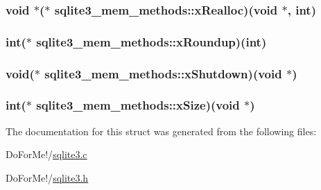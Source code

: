 \hypertarget{structsqlite3__mem__methods_a5bb7e62164d0934888473c618c61dc77}{
\subsubsection[{x\-Realloc}]{\setlength{\rightskip}{0pt plus 5cm}void $\ast$($\ast$ sqlite3\-\_\-mem\-\_\-methods\-::x\-Realloc)(void $\ast$, int)}}\label{structsqlite3__mem__methods_a5bb7e62164d0934888473c618c61dc77}
\hypertarget{structsqlite3__mem__methods_a8b3f0d1ddeb498c4aaf9bbce5b92a268}{
\subsubsection[{x\-Roundup}]{\setlength{\rightskip}{0pt plus 5cm}int($\ast$ sqlite3\-\_\-mem\-\_\-methods\-::x\-Roundup)(int)}}\label{structsqlite3__mem__methods_a8b3f0d1ddeb498c4aaf9bbce5b92a268}
\hypertarget{structsqlite3__mem__methods_a6f48100692bd935d7f3dbb8c701ab6ca}{
\subsubsection[{x\-Shutdown}]{\setlength{\rightskip}{0pt plus 5cm}void($\ast$ sqlite3\-\_\-mem\-\_\-methods\-::x\-Shutdown)(void $\ast$)}}\label{structsqlite3__mem__methods_a6f48100692bd935d7f3dbb8c701ab6ca}
\hypertarget{structsqlite3__mem__methods_a6c68275b577d66ae659ef30344c8f86c}{
\subsubsection[{x\-Size}]{\setlength{\rightskip}{0pt plus 5cm}int($\ast$ sqlite3\-\_\-mem\-\_\-methods\-::x\-Size)(void $\ast$)}}\label{structsqlite3__mem__methods_a6c68275b577d66ae659ef30344c8f86c}


The documentation for this struct was generated from the following files\-:\begin{DoxyCompactItemize}
\item 
Do\-For\-Me!/\hyperlink{sqlite3_8c}{sqlite3.\-c}\item 
Do\-For\-Me!/\hyperlink{sqlite3_8h}{sqlite3.\-h}\end{DoxyCompactItemize}
